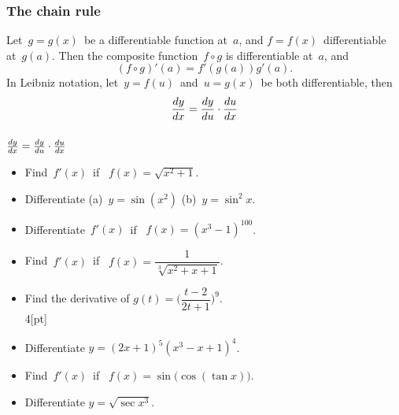 

 \begin{frame}[fragile] \frametitle{The chain rule}
Let\ $g=g(x)$\ be a differentiable function at\ $a$, and $f=f(x)$\ differentiable at\ $g(a)$. Then the composite function\ $f\circ g$ is differentiable at\ $a$, and
{\[ (f\circ g)'(a) = f'(g(a)) g'(a) .\]}
In Leibniz notation, let\ $y=f(u)$\ and\ $u=g(x)$\ be both differentiable, then
{\[\frac{d {y} }{d x} = \frac{d y}{d u} \cdot \frac{d {u} }{d x} \]}
\end{frame}

 \begin{frame}[fragile] \frametitle{}

$\frac{d {y} }{d x} = \frac{d y}{d u} \cdot \frac{d {u} }{d x} $

\begin{itemize}
	\item Find\ $f'(x)$\ if \ $f(x)=\sqrt{x^2+1}$. \\
	\item Differentiate\; (a)\ $y=\sin (x^2)$ \quad  (b)\ $y=\sin^2 x$.
	\item Differentiate\ $f'(x)$\ if \ $f(x)=(x^3-1)^{100}$. \\
	\item Find\  $f'(x)$\ if \ $f(x)=\dfrac{1}{\sqrt[3]{x^2+x+1}}$. 
\end{itemize}


\begin{itemize}
	\item Find the derivative of\; $g(t)= \big( \dfrac{t-2}{2t+1} \big)^9$.\\4[pt]
	\item Differentiate\; $y=(2x+1)^5(x^3-x+1)^4$. \\
	\item Find\  $f'(x)$\ if \ $f(x)=\sin \big( \cos ( \tan x ) \big)$. 
	\item Differentiate\; $y=\sqrt{\sec x^3}$.	
\end{itemize}


\end{frame}

